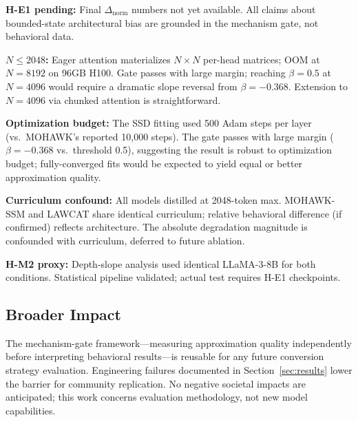 \textbf{H-E1 pending:} Final $\Delta_\text{norm}$ numbers not yet available. All claims about
bounded-state architectural bias are grounded in the mechanism gate, not behavioral data.

\textbf{$N \leq 2048$:} Eager attention materializes $N \times N$ per-head matrices; OOM at
$N=8192$ on 96GB H100. Gate passes with large margin; reaching $\beta=0.5$ at $N=4096$ would
require a dramatic slope reversal from $\beta=-0.368$. Extension to $N=4096$ via chunked
attention is straightforward.

\textbf{Optimization budget:} The SSD fitting used 500 Adam steps per layer (vs.\ MOHAWK's
reported 10,000 steps). The gate passes with large margin ($\beta=-0.368$ vs.\ threshold 0.5),
suggesting the result is robust to optimization budget; fully-converged fits would be expected
to yield equal or better approximation quality.

\textbf{Curriculum confound:} All models distilled at 2048-token max. MOHAWK-SSM and LAWCAT
share identical curriculum; relative behavioral difference (if confirmed) reflects architecture.
The absolute degradation magnitude is confounded with curriculum, deferred to future ablation.

\textbf{H-M2 proxy:} Depth-slope analysis used identical LLaMA-3-8B for both conditions.
Statistical pipeline validated; actual test requires H-E1 checkpoints.

\subsection{Broader Impact}

The mechanism-gate framework---measuring approximation quality independently before interpreting
behavioral results---is reusable for any future conversion strategy evaluation. Engineering
failures documented in Section~\ref{sec:results} lower the barrier for community replication.
No negative societal impacts are anticipated; this work concerns evaluation methodology, not
new model capabilities.
